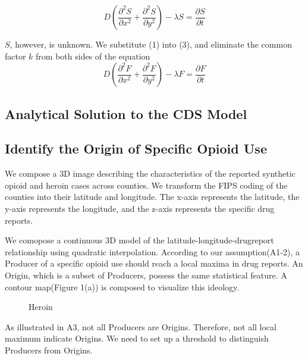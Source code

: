\begin{equation}
D(\frac{\partial^2 S}{\partial x^2} + \frac{\partial^2 S}{\partial y^2}) - \lambda S = \frac{\partial S}{\partial t} 
\end{equation}

$S$, however, is unknown. We substitute (1) into (3), and eliminate the common factor $k$ from both sides of the equation
\begin{equation}
D(\frac{\partial^2 F}{\partial x^2} + \frac{\partial^2 F}{\partial y^2}) - \lambda F = \frac{\partial F}{\partial t}
\end{equation}

\subsection{Analytical Solution to the CDS Model}

\subsection{Identify the Origin of Specific Opioid Use}
We compose a 3D image describing the characteristics of the reported synthetic opioid and heroin cases across counties. We transform the FIPS coding of the counties into their latitude and longitude. The x-axis represents the latitude, the y-axis represents the longitude, and the z-axis represents the specific drug reports.

We comopose a continuous 3D model of the latitude-longitude-drugreport relationship using quadratic interpolation. According to our assumption(A1-2), a Producer of a specific opioid use should reach a local maxima in drug reports. An Origin, which is a subset of Producers, possess the same statistical feature. A contour map(Figure 1(a)) is composed to visualize this ideology.

\begin{figure}[H]
	\centering
	\caption{Heroin}
\end{figure}

As illustrated in A3, not all Producers are Origins. Therefore, not all local maximum indicate Origins. We need to set up a threshold to distinguish Producers from Origins. 

